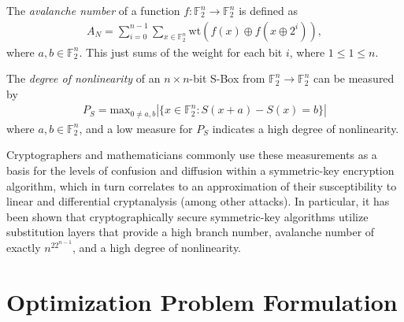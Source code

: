 \documentclass[11pt]{article}
\newcommand{\field}[1]{\mathbb{#1}} %
\begin{document}
\begin{define}
The \emph{avalanche number} of a function $f : \field{F}_2^n \to \field{F}_2^n$ is defined as
\begin{eqnarray}
A_N = \sum_{i = 0}^{n - 1}\sum_{x \in \field{F}_2^n} \text{wt}(f(x) \oplus f(x \oplus 2^{i})),
\end{eqnarray}
where $a, b \in \field{F}_2^n$. This just sums of the weight for each bit $i$, where $1 \leq 1 \leq n$.
\end{define}

\begin{define}
The \emph{degree of nonlinearity} of an $n \times n$-bit S-Box from $\field{F}_2^n \to \field{F}_2^n$ can be measured by
\begin{eqnarray}
	P_S = \text{max}_{0 \not= a, b}|\{x \in \field{F}_2^n : S(x + a) - S(x) = b\}|
\end{eqnarray}
where $a, b \in \field{F}_2^n$, and a low measure for $P_S$ indicates a high degree of nonlinearity.%
\end{define}

Cryptographers and mathematicians commonly use these measurements as a basis for the levels of confusion and diffusion within a symmetric-key encryption algorithm, which in turn correlates to an approximation of their susceptibility to linear and differential cryptanalysis (among other attacks). In particular, it has been shown that cryptographically secure symmetric-key algorithms utilize substitution layers that provide a high branch number, avalanche number of exactly $n^22^{n-1}$, and a high degree of nonlinearity.

\section{Optimization Problem Formulation}
\end{document}
